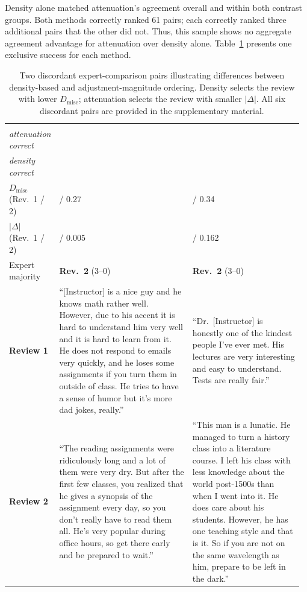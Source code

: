 \documentclass[fleqn,10pt]{JLA_article}
\begin{document}
Density alone matched attenuation's agreement overall and within both contrast groups. Both methods correctly ranked 61 pairs; each correctly ranked three additional pairs that the other did not. Thus, this sample shows no aggregate agreement advantage for attenuation over density alone. Table~\ref{tab:discordant} presents one exclusive success for each method.
\begin{table}[htbp]
\caption{Two discordant expert-comparison pairs illustrating differences between density-based and adjustment-magnitude ordering. Density selects the review with lower $D_{\text{misc}}$; attenuation selects the review with smaller $|\Delta|$. All six discordant pairs are provided in the supplementary material.}
\label{tab:discordant}
\small
\centering
\setlength{\tabcolsep}{4pt}
\renewcommand{\arraystretch}{1.1}
\begin{tabular}{>{\raggedright\arraybackslash}p{0.13\linewidth}>{\raggedright\arraybackslash}p{0.46\linewidth}>{\raggedright\arraybackslash}p{0.38\linewidth}}
\toprule
 & \shortstack[l]{\textbf{Pair 1}\\\textit{attenuation correct}} & \shortstack[l]{\textbf{Pair 6}\\\textit{density correct}} \\
\midrule
 $D_{\text{misc}}$ (Rev.\ 1 / 2) & 0.21 / 0.27 & 0.48 / 0.34 \\
 $|\Delta|$ (Rev.\ 1 / 2) & 0.222 / 0.005 & 0.063 / 0.162 \\
Expert majority & \textbf{Rev.\ 2} (3--0) & \textbf{Rev.\ 2} (3--0) \\
\midrule
\textbf{Review 1} &
{\scriptsize ``[Instructor] is a nice guy and he knows math rather well. However, due to his accent it is hard to understand him very well and it is hard to learn from it. He does not respond to emails very quickly, and he loses some assignments if you turn them in outside of class. He tries to have a sense of humor but it's more dad jokes, really.''} &
{\scriptsize ``Dr.\ [Instructor] is honestly one of the kindest people I've ever met. His lectures are very interesting and easy to understand. Tests are really fair.''} \\
\addlinespace[2pt]
\textbf{Review 2} &
{\scriptsize ``The reading assignments were ridiculously long and a lot of them were very dry. But after the first few classes, you realized that he gives a synopsis of the assignment every day, so you don't really have to read them all. He's very popular during office hours, so get there early and be prepared to wait.''} &
{\scriptsize ``This man is a lunatic. He managed to turn a history class into a literature course. I left his class with less knowledge about the world post-1500s than when I went into it. He does care about his students. However, he has one teaching style and that is it. So if you are not on the same wavelength as him, prepare to be left in the dark.''} \\
\bottomrule
\end{tabular}
\end{table}
\end{document}
